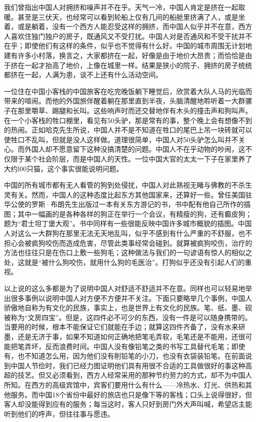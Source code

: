 \documentclass[12pt,oneside]{book}
\begin{document}
\begin{common-format}
我们曾指出中国人对拥挤和噪声并不在乎。天气一冷，中国人肯定是挤在一起取暖。甚至是三伏天，也经常可以看到轮船上仅有几间的船舱里挤满了人，或是坐着，或是躺着，没有一个西方人能忍受这样的拥挤，而中国人似乎并不在意，西方人喜欢住独门独户的房子，既通风又不受打扰。中国人对是否通风和不受干扰并不在乎；即使他们有这样的条件，似乎也不觉得有什么好。中国的城市周围无计划地建有许多小村落，换言之，大家都挤在一起，好像是由于地价大昂贵；而恰恰是由于挤在一起才抬高了地价，上像在城里一样。结果是狭小的院子、拥挤的房子统统都挤在一起，人满为患，谈不上还有什么活动空间。 

一位住在中国小客栈的中国旅客在吃完晚饭躺下睡觉后，欣赏着大队人马的光临而带来的喧闹。而他的外国旅伴醒着躺在那里直到半夜，头脑清醒地聆听着一大群骡子在那里嚼草、踢腿和长叫。这些响声时而还交替地伴有木头的撞击声和狗叫声。在一个小客栈的牲口棚里，看见有50头驴，那是常有的事，整个晚上会有想像不到的热闹。正如哈克先生所说，中国人并不是不知道在牲口的尾巴上吊一块砖就可以使牲口不乱叫，但就是没人这样做。道理很简单，中国人对50头驴怎么叫并不关心。而外国人却不愿意留下这种没搞清楚的问题。中国人不在乎动物的吵闹，这不仅限于某个社会阶层，而是中国人的天性。一位中国大官的太太一下子在家里养了大约l00只猫，这个事实很能说明问题。 

中国的所有城市都有无人看管的狗到处侵扰，中国人对此熟视无睹与佛教的不杀生灵有关。然而，中国人的这种态度比起东方其他国家来，还算好一些。曾任美国驻华公使的罗斯·布朗先生出版过一本有关东方游记的书，书中配有他自己所作的插图；其中一幅画的是各种各样的狗正在举行一个会议，有精瘦的狗，还有癫皮狗；题为“君士坦丁堡大观”。书中同样有一些很能反映中国许多城市概貌的插图。中国人对这么一大群狗在那里无法无天地乱叫，似乎不感到有什么严重的不舒服，也不担心会被疯狗咬伤而造成危害，尽管此类事经常会碰到。就算被疯狗咬伤，治疗的方法也往往只是在伤口上敷一些狗毛；这种做法与我们的一句谚语有惊人的相似之处，这就是“被什么狗咬伤，就用什么狗的毛医治”。打狗似乎还没有引起人们的重视。 

以上说的这么多都是为了说明中国人对舒适不舒适并不在意。同样也可以轻易地举出很多事例以说明中国人对方便不方便并不关注。下面只要略举几个事例，中国人骄傲地自称为有文化的民族，事实上，也是世界上有文化的民族。笔、纸、墨、砚被称为“文房四宝”。但是，这四件必不可少的东西，没有一件是可以随身携带的。当要用的时候，根本不能保证它们就能在手边；就算这四件齐备了，没有水来研墨，还是无济于事，如果不知道如何正确地把笔毛弄软，毛笔还是不能用，还很可能把笔弄坏，反而浪费时间。中国人没有像铅笔之类的书写工具替代毛笔；即使有，也不知道怎么用，因为他们没有削铅笔的小刀，也没有衣袋装铅笔。在前面说到中国人节俭时，我们已经力图证明他们具有用很不合适的工具做很好的事这种高超的技艺。但又必须看到，西方人经常采用的那种节约劳力的方式，却不为中国人所知。在西方的高级宾馆中，宾客们要用什么有什么——冷热水、灯光、供热和其他服务。而中国18个省份中最好的旅店也只是像下等的客栈；口头上说得很好，但客人却没能得到应有的服务；每当这时，客人只好到房门外大声叫喊，希望店主能听到他们的呼声，但往往事与愿违。 


\end{common-format}
\end{document}
